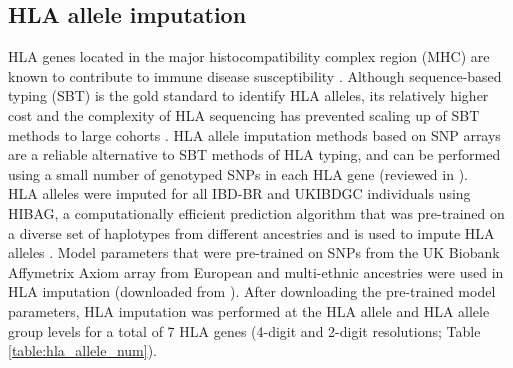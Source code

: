 
\subsection{HLA allele imputation}
HLA genes located in the major histocompatibility complex region (MHC) are known to contribute to immune disease susceptibility \cite{Shiina2009-wt}. Although sequence-based typing (SBT) is the gold standard to identify HLA alleles, its relatively higher cost and the complexity of HLA sequencing has prevented scaling up of SBT methods to large cohorts \cite{Beksac2014-gm}. HLA allele imputation methods based on SNP arrays are a reliable alternative to SBT methods of HLA typing, and can be performed using a small number of genotyped SNPs in each HLA gene \cite{De_Bakker2006-ho,Monsuur2008-fk,Jia2013-mh,Zheng2014-mj,Cook2021-px,Naito2021-jl} (reviewed in \cite{Naito2022-qy}). \\

HLA alleles were imputed for all IBD-BR and UKIBDGC individuals using HIBAG, a computationally efficient prediction algorithm that was pre-trained on a diverse set of haplotypes from different ancestries and is used to impute HLA alleles \cite{Zheng2014-mj}. Model parameters that were pre-trained on SNPs from the UK Biobank Affymetrix Axiom array from European and multi-ethnic ancestries were used in HLA imputation (downloaded from \cite{hibag-models-docs}). After downloading the pre-trained model parameters, HLA imputation was performed at the HLA allele and HLA allele group levels  for a total of 7 HLA genes (4-digit and 2-digit resolutions; Table \ref{table:hla_allele_num}). 

